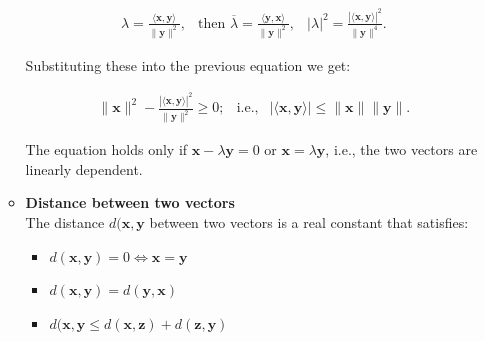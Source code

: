 \documentclass[10pt,b5paper,titlepage]{book}
\begin{document}
\begin{itemize}
\begin{itemize}
                 \begin{equation}
                     \begin{array}{lcr}
                         \lambda
                         = \frac{\langle \mathbf{x}, \mathbf{y} \rangle}{\|\mathbf{y}\|^{2}},&
                         \text{then } \overline{\lambda}
                         = \frac{\langle \mathbf{y}, \mathbf{x} \rangle}{\|\mathbf{y}\|^{2}},&
                         |\lambda|^{2}
                         = \frac{|\langle \mathbf{x}, \mathbf{y} \rangle|^{2}}{\|\mathbf{y}\|^{4}}.
                     \end{array}
                 \end{equation}

                 Substituting these into the previous equation we get:

                 \begin{equation}
                     \begin{array}{lcr}
                         \|\mathbf{x}\|^{2}
                         - \frac{|\langle \mathbf{x}, \mathbf{y} \rangle|^{2}}
                         {\|\mathbf{y}\|^{2}} \ge 0;&
                         \text{i.e.,}&
                         |\langle \mathbf{x}, \mathbf{y} \rangle|
                         \le \|\mathbf{x}\| \|\mathbf{y}\|.
                     \end{array}
                 \end{equation}

                 The equation holds only if $\mathbf{x} - \lambda \mathbf{y} = 0$
                 or $\mathbf{x} = \lambda \mathbf{y}$, i.e., the two vectors are
                 linearly dependent.

             \item \textbf{Distance between two vectors}\\

                 The distance $d(\mathbf{x}, \mathbf{y}$ between two vectors is
                 a real constant that satisfies:

                 \begin{itemize}
                     \item $d(\mathbf{x}, \mathbf{y}) = 0 \iff \mathbf{x} = \mathbf{y}$
                     \item $d(\mathbf{x}, \mathbf{y}) = d(\mathbf{y}, \mathbf{x})$
                     \item $d(\mathbf{x}, \mathbf{y} \le  d(\mathbf{x}, \mathbf{z}) + d(\mathbf{z}, \mathbf{y})$
                 \end{itemize}


\end{itemize}
\end{itemize}
\end{document}
